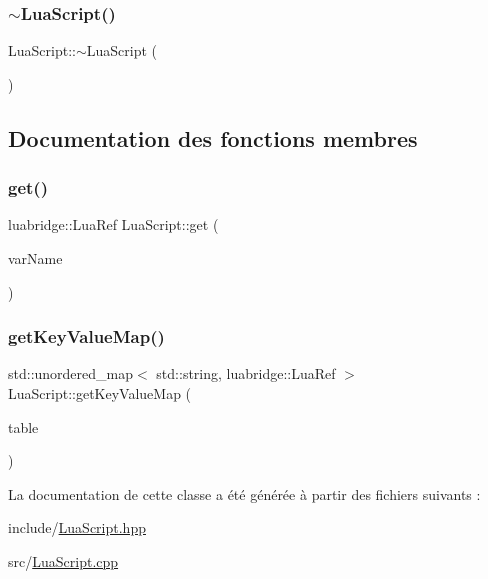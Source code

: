 \subsubsection{\texorpdfstring{$\sim$\+Lua\+Script()}{~LuaScript()}}
{\footnotesize\ttfamily Lua\+Script\+::$\sim$\+Lua\+Script (\begin{DoxyParamCaption}{ }\end{DoxyParamCaption})}



\subsection{Documentation des fonctions membres}
\mbox{\label{classLuaScript_a7f5b82c910622d8096ece13da5cd85d5}} 
\subsubsection{\texorpdfstring{get()}{get()}}
{\footnotesize\ttfamily luabridge\+::\+Lua\+Ref Lua\+Script\+::get (\begin{DoxyParamCaption}\item[{const std\+::string \&}]{var\+Name }\end{DoxyParamCaption})}

\mbox{\label{classLuaScript_a05bcad381dac15ea1b5399045651497d}} 
\subsubsection{\texorpdfstring{get\+Key\+Value\+Map()}{getKeyValueMap()}}
{\footnotesize\ttfamily std\+::unordered\+\_\+map$<$ std\+::string, luabridge\+::\+Lua\+Ref $>$ Lua\+Script\+::get\+Key\+Value\+Map (\begin{DoxyParamCaption}\item[{const luabridge\+::\+Lua\+Ref \&}]{table }\end{DoxyParamCaption})}



La documentation de cette classe a été générée à partir des fichiers suivants \+:\begin{DoxyCompactItemize}
\item 
include/\hyperlink{LuaScript_8hpp}{Lua\+Script.\+hpp}\item 
src/\hyperlink{LuaScript_8cpp}{Lua\+Script.\+cpp}\end{DoxyCompactItemize}
